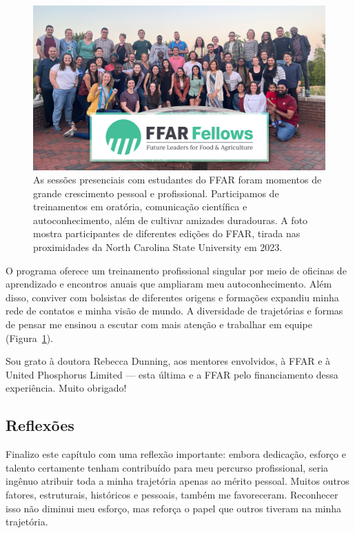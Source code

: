 \documentclass[12pt,a4paper,oneside]{book}
\newcommand{\NCState}{North Carolina State University}
\newcommand{\HeroFigPad}{\vspace{-1cm}}
\begin{document}
\begin{figure}[h]
\HeroFigPad
\begin{center}
  \includegraphics[height=0.4\textheight, keepaspectratio]{images/ffar_2023.jpg}
\end{center}
  \caption{
    As sessões presenciais com estudantes do FFAR foram momentos de grande crescimento pessoal e profissional. Participamos de 
    treinamentos em oratória, comunicação científica e autoconhecimento, além de cultivar amizades duradouras. A foto mostra 
    participantes de diferentes edições do FFAR, tirada nas proximidades da \NCState{} em 2023.
  }
  \label{fig_ffar}
\end{figure}
  
O programa oferece um treinamento profissional singular por meio de oficinas de aprendizado e encontros anuais que ampliaram meu autoconhecimento.
Além disso, conviver com bolsistas de diferentes origens e formações expandiu minha rede de contatos e minha visão de mundo.
A diversidade de trajetórias e formas de pensar me ensinou a escutar com mais atenção e trabalhar em equipe (Figura~\ref{fig_ffar}).

Sou grato à doutora Rebecca Dunning, aos mentores envolvidos, à FFAR e à United Phosphorus Limited — esta última 
e a FFAR pelo financiamento dessa experiência. Muito obrigado!
    
    
\subsection{Reflexões}

Finalizo este capítulo com uma reflexão importante: embora dedicação, esforço e talento certamente 
tenham contribuído para meu percurso profissional, seria ingênuo atribuir toda a minha trajetória 
apenas ao mérito pessoal. Muitos outros fatores, estruturais, históricos e pessoais, também me 
favoreceram. Reconhecer isso não diminui meu esforço, mas reforça o papel que outros tiveram na minha trajetória.
\end{document}
